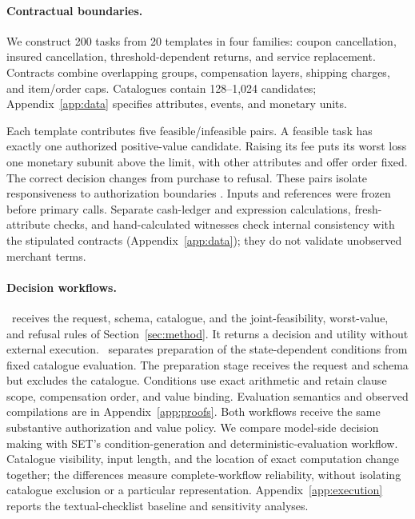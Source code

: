 \paragraph{Contractual boundaries.}
We construct 200 tasks from 20 templates in four families: coupon cancellation, insured cancellation, threshold-dependent returns, and service replacement. Contracts combine overlapping groups, compensation layers, shipping charges, and item/order caps. Catalogues contain 128--1,024 candidates; Appendix~\ref{app:data} specifies attributes, events, and monetary units.

Each template contributes five feasible/infeasible pairs. A feasible task has exactly one authorized positive-value candidate. Raising its fee puts its worst loss one monetary subunit above the limit, with other attributes and offer order fixed. The correct decision changes from purchase to refusal. These pairs isolate responsiveness to authorization boundaries \citep{checklist,contrastsets}. Inputs and references were frozen before primary calls. Separate cash-ledger and expression calculations, fresh-attribute checks, and hand-calculated witnesses check internal consistency with the stipulated contracts (Appendix~\ref{app:data}); they do not validate unobserved merchant terms.

\paragraph{Decision workflows.}
\direct\ receives the request, schema, catalogue, and the joint-feasibility, worst-value, and refusal rules of Section~\ref{sec:method}. It returns a decision and utility without external execution. \ours\ separates preparation of the state-dependent conditions from fixed catalogue evaluation. The preparation stage receives the request and schema but excludes the catalogue. Conditions use exact arithmetic and retain clause scope, compensation order, and value binding. Evaluation semantics and observed compilations are in Appendix~\ref{app:proofs}. Both workflows receive the same substantive authorization and value policy. We compare model-side decision making with SET's condition-generation and deterministic-evaluation workflow. Catalogue visibility, input length, and the location of exact computation change together; the differences measure complete-workflow reliability, without isolating catalogue exclusion or a particular representation. Appendix~\ref{app:execution} reports the textual-checklist baseline and sensitivity analyses.

